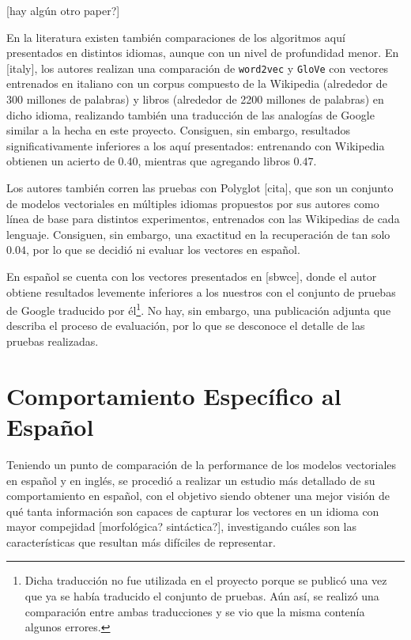
[hay algún otro paper?]

En la literatura existen también comparaciones de los algoritmos aquí presentados en distintos
idiomas, aunque con un nivel de profundidad menor. En [italy], los autores realizan una comparación
de \texttt{word2vec} y \texttt{GloVe} con vectores entrenados en italiano con un corpus compuesto de
la Wikipedia (alrededor de 300 millones de palabras) y libros (alrededor de 2200 millones de
palabras) en dicho idioma, realizando también una traducción de las analogías de Google similar a la
hecha en este proyecto. Consiguen, sin embargo, resultados significativamente inferiores a los aquí
presentados: entrenando con Wikipedia obtienen un acierto de $0.40$, mientras que agregando libros
$0.47$.

Los autores también corren las pruebas con Polyglot [cita], que son un conjunto de modelos
vectoriales en múltiples idiomas propuestos por sus autores como línea de base para distintos
experimentos, entrenados con las Wikipedias de cada lenguaje. Consiguen, sin embargo, una exactitud
en la recuperación de tan solo $0.04$, por lo que se decidió ni evaluar los vectores en español.

En español se cuenta con los vectores presentados en [sbwce], donde el autor obtiene resultados
levemente inferiores a los nuestros con el conjunto de pruebas de Google traducido por
él\footnote{Dicha traducción no fue utilizada en el proyecto porque se publicó una vez que ya se
había traducido el conjunto de pruebas. Aún así, se realizó una comparación entre ambas traducciones
y se vio que la misma contenía algunos errores.}. No hay, sin embargo, una publicación adjunta que
describa el proceso de evaluación, por lo que se desconoce el detalle de las pruebas realizadas.



\section{Comportamiento Específico al Español}

Teniendo un punto de comparación de la performance de los modelos vectoriales en español y en
inglés, se procedió a realizar un estudio más detallado de su comportamiento en español, con el
objetivo siendo obtener una mejor visión de qué tanta información son capaces de capturar los
vectores en un idioma con mayor compejidad [morfológica? sintáctica?], investigando cuáles son las
características que resultan más difíciles de representar.

